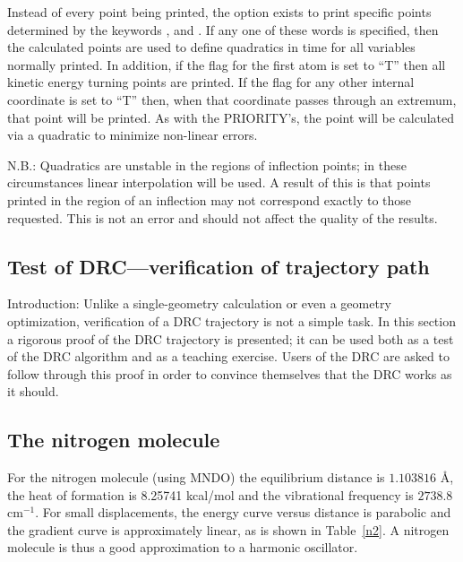 Instead of every point being printed, the option  exists  to  print specific
points  determined  by the keywords ,  and
.  If any one of these words is specified, then the calculated
points  are used to define quadratics in time for all variables normally
printed.  In addition, if the flag for the first atom is set to  ``T''  then
all  kinetic  energy  turning  points  are printed.  If the flag for any other
internal coordinate is set to ``T'' then, when that coordinate  passes through
an extremum, that point will be printed.  As with the PRIORITY's, the point
will be calculated via  a  quadratic  to  minimize  non-linear errors.

N.B.:  Quadratics are unstable in the regions of inflection points; in  these
circumstances linear interpolation will be used.  A result of this is that
points printed in the  region  of  an  inflection  may  not correspond  exactly
to those requested.  This is not an error and should not affect the quality of
the results.

\subsection*{Test of DRC---verification of trajectory path}
Introduction:  Unlike  a  single-geometry  calculation  or  even  a geometry
optimization, verification of a DRC trajectory is not a simple task.  In this
section  a  rigorous  proof  of  the  DRC  trajectory  is presented;  it  can
be used both as a test of the DRC algorithm and as a teaching exercise.  Users
of the DRC are asked to  follow  through  this proof in order to convince
themselves that the DRC works as it should.

\subsection*{The nitrogen molecule}
For the nitrogen molecule (using MNDO) the equilibrium  distance is  $1.103816$
\AA, the heat of formation is 8.25741 kcal/mol and the vibrational frequency is
$2738.8$ cm$^{-1}$.   For  small  displacements, the  energy curve versus
distance is parabolic and the gradient curve is approximately linear, as is
shown in Table~\ref{n2}.         A  nitrogen molecule is thus a good
approximation to a harmonic oscillator.

